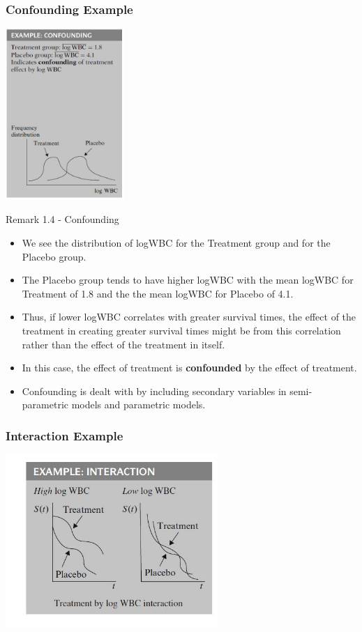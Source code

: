 \documentclass{beamer}
\theoremstyle{definition}
\begin{document}
\begin{frame}
\frametitle{Confounding Example}
 \includegraphics[width =\textwidth, height=6.5cm]{Ch1_Confound.JPG}
 \end{frame}

\begin{frame}
\begin{block}{Remark 1.4 - Confounding}
\begin{itemize}
\item We see the distribution of logWBC for the Treatment group and for the Placebo group.
\item The Placebo group tends to have higher logWBC with the mean logWBC for Treatment of 1.8 and the the mean logWBC for Placebo of 4.1.
\item Thus, if lower logWBC correlates with greater survival times, the effect of the treatment in creating greater survival times might be from this correlation rather than the effect of the treatment in itself.
\item In this case, the effect of treatment is \textbf{confounded} by the effect of treatment.
\item Confounding is dealt with by including secondary variables in semi-parametric models and parametric models.
\end{itemize}
\end{block}
\end{frame}


\begin{frame}
\frametitle{Interaction Example}
 \includegraphics[width =\textwidth, height=6.5cm]{Ch1_Interact.JPG}
 \end{frame}
\end{document}
